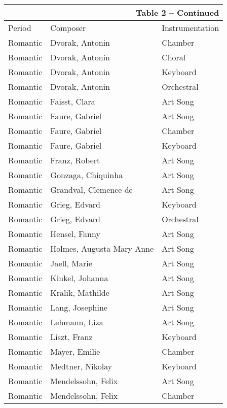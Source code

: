 \begin{table}[!htbp]
    \centering
    \begin{tabular}{@{}lll@{}}
        \multicolumn{3}{r}{Table 2 -- Continued} \\
        \toprule
        Period    & Composer                  & Instrumentation \\
        \midrule
        Romantic & Dvorak, Antonin & Chamber \\
        Romantic & Dvorak, Antonin & Choral \\
        Romantic & Dvorak, Antonin & Keyboard \\
        Romantic & Dvorak, Antonin & Orchestral \\
        Romantic & Faisst, Clara & Art Song \\
        Romantic & Faure, Gabriel & Art Song \\
        Romantic & Faure, Gabriel & Chamber \\
        Romantic & Faure, Gabriel & Keyboard \\
        Romantic & Franz, Robert & Art Song \\
        Romantic & Gonzaga, Chiquinha & Art Song \\
        Romantic & Grandval, Clemence de & Art Song \\
        Romantic & Grieg, Edvard & Keyboard \\
        Romantic & Grieg, Edvard & Orchestral \\
        Romantic & Hensel, Fanny & Art Song \\
        Romantic & Holmes, Augusta Mary Anne & Art Song \\
        Romantic & Jaell, Marie & Art Song \\
        Romantic & Kinkel, Johanna & Art Song \\
        Romantic & Kralik, Mathilde & Art Song \\
        Romantic & Lang, Josephine & Art Song \\
        Romantic & Lehmann, Liza & Art Song \\
        Romantic & Liszt, Franz & Keyboard \\
        Romantic & Mayer, Emilie & Chamber \\
        Romantic & Medtner, Nikolay & Keyboard \\
        Romantic & Mendelssohn, Felix & Art Song \\
        Romantic & Mendelssohn, Felix & Chamber \\

\end{tabular}
\end{table}
